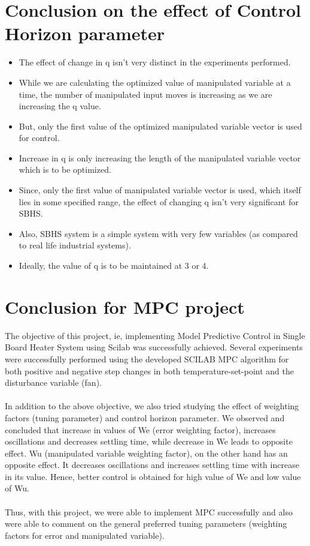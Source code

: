 \section{Conclusion on the effect of Control Horizon parameter }
\begin{itemize}
\item The effect of change in q isn’t very distinct in the experiments performed.
\item While we are calculating the optimized value of manipulated variable at a time, the number of manipulated input moves is increasing as we are increasing the q value. 
\item But, only the first value of the optimized manipulated variable vector is used for control. 
\item Increase in q is only increasing the length of the manipulated variable vector which is to be optimized.
\item Since, only the first value of manipulated variable vector is used, which itself lies in some specified range, the effect of changing q isn’t very significant for SBHS.
\item Also, SBHS system is a simple system with very few variables (as compared to real life industrial systems).
\item Ideally, the value of q is to be maintained at 3 or 4.
\end{itemize}



\section{Conclusion for MPC project}
The objective of this project, ie, implementing Model Predictive Control in Single Board Heater System using Scilab was successfully achieved. Several experiments were successfully performed using the developed SCILAB MPC algorithm for both positive and negative step changes in both temperature-set-point and the disturbance variable (fan). 
\\ \\ 
In addition to the above objective, we also tried studying the effect of weighting factors (tuning parameter) and control horizon parameter. We observed and concluded that increase in values of We (error weighting factor), increases oscillations and decreases settling time, while decrease in We leads to opposite effect. Wu (manipulated variable weighting factor), on the other hand has an opposite effect. It decreases oscillations and increases settling time with increase in its value. Hence, better control is obtained for high value of We and low value of Wu.
\\ \\
Thus, with this project, we were able to implement MPC successfully and also were able to comment on the general preferred tuning parameters (weighting factors for error and manipulated variable).
\\ \\

